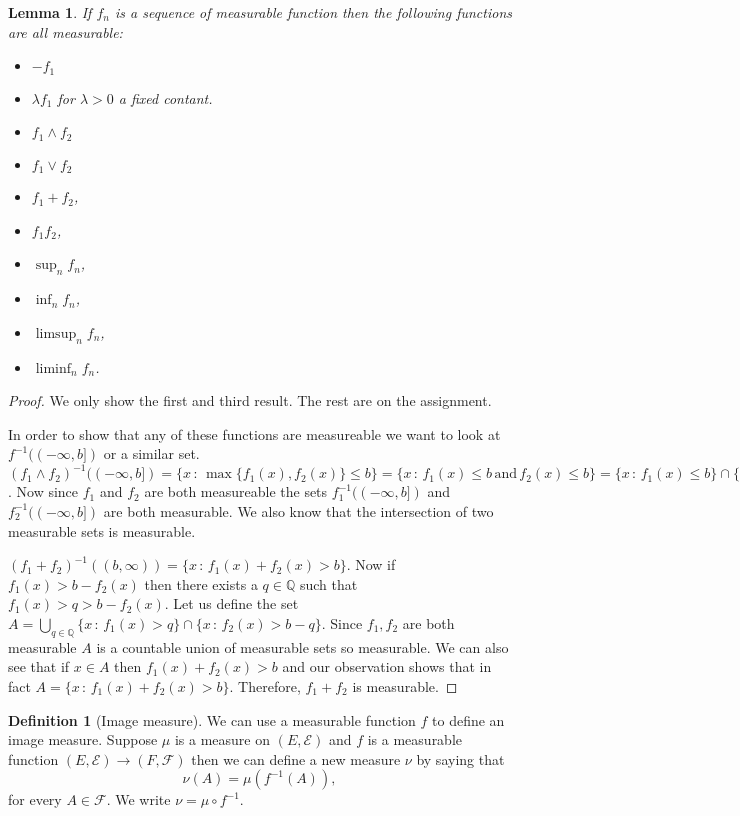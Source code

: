 \documentclass[11pt]{article}
\newtheorem{lem}[thm]{Lemma}
\theoremstyle{definition}
\newtheorem{dfn}[thm]{Definition}
\theoremstyle{remark}
\begin{document}
\begin{lem}
If $f_n$ is a sequence of measurable function then the following functions are all measurable:
\begin{itemize}
\item $-f_1$
\item $\lambda f_1$ for $\lambda >0$ a fixed contant.
\item $f_1 \wedge f_2$
\item $f_1 \vee f_2$
\item $f_1+f_2$,
\item $f_1 f_2$,
\item $\sup_n f_n$,
\item $\inf_n f_n$,
\item $\limsup_n f_n$,
\item $\liminf_n f_n$.
\end{itemize}
\end{lem}
\begin{proof} We only show the first and third result. The rest are on the assignment.

 In order to show that any of these functions are measureable we want to look at $f^{-1}((-\infty, b])$ or a similar set. $(f_1 \wedge f_2)^{-1}((-\infty, b]) = \{ x \,:\, \max\{f_1(x), f_2(x)\} \leq b\} = \{ x \,:\, f_1(x) \leq b \, \mbox{and} \, f_2(x) \leq b\} = \{ x \,:\, f_1(x) \leq b \} \cap \{x \,:\, f_2(x) \leq b\} = f_1^{-1}((-\infty, b]) \cap f_2^{-1}((-\infty, b])$. Now since $f_1$ and $f_2$ are both measureable the sets $f_1^{-1}((-\infty, b])$ and $f_2^{-1}((-\infty, b])$ are both measurable. We also know that the intersection of two measurable sets is measurable.

$(f_1+f_2)^{-1}((b,\infty)) = \{ x \,:\, f_1(x) + f_2(x) > b \}$. Now if $f_1(x) > b-f_2(x)$ then there exists a $q \in \mathbb{Q}$ such that $f_1(x)> q > b - f_2(x)$. Let us define the set $A= \bigcup_{q \in \mathbb{Q}} \{ x \,:\, f_1(x) > q\} \cap \{ x\,:\, f_2(x) > b-q\}$. Since $f_1,f_2$ are both measurable $A$ is a countable union of measurable sets so measurable. We can also see that if $x \in A$ then $f_1(x) + f_2(x) > b$ and our observation shows that in fact $A=  \{ x \,:\, f_1(x) + f_2(x) > b \}$. Therefore, $f_1+f_2$ is measurable.
\end{proof}



\begin{dfn}[Image measure]
We can use a measurable function $f$ to define an image measure. Suppose $\mu$ is a measure on $(E, \mathcal{E})$ and $f$ is a measurable function $(E, \mathcal{E}) \rightarrow (F, \mathcal{F})$ then we can define a new measure $\nu$ by saying that
\[ \nu(A) = \mu(f^{-1}(A)),  \] for every $A \in \mathcal{F}$. We write $\nu = \mu \circ f^{-1}$.
\end{dfn}
\end{document}
